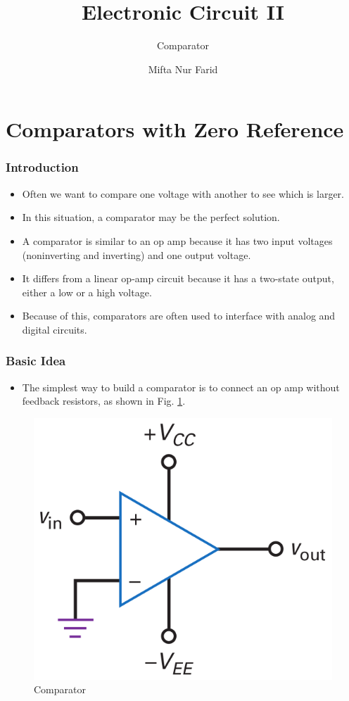\documentclass[pdflatex,compress]{beamer}
\title{Electronic Circuit II}
\subtitle{Comparator}
\author{Mifta Nur Farid}
\begin{document}
\maketitle

\section{Comparators with Zero Reference}

\begin{frame}
	\frametitle{Introduction}
	\begin{itemize}
		\item Often we want to compare one voltage with another to see which is larger.
		\item In this situation, a comparator may be the perfect solution.
		\item A comparator is similar to an op amp because it has two input voltages (noninverting and inverting) and one output voltage.
		\item It differs from a linear op-amp circuit because it has a two-state output, either a low or a high voltage.
		\item Because of this, comparators are often used to interface with analog and digital circuits.
	\end{itemize}
\end{frame}

\begin{frame}
	\frametitle{Basic Idea}
	\begin{multicols}{2}
		\begin{itemize}
			\item The simplest way to build a comparator is to connect an op amp without feedback resistors, as shown in Fig. \ref{fig:img01}.
		\end{itemize}
		\columnbreak
		\begin{figure}
			\centering
			\includegraphics[width=0.7\linewidth]{img/img01}
			\caption{Comparator}
			\label{fig:img01}
		\end{figure}
	\end{multicols}
\end{frame}
\end{document}
